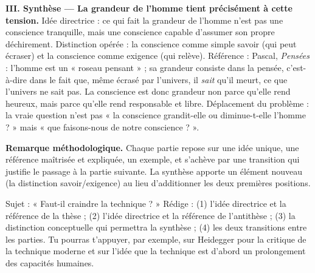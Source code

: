 \documentclass[11pt]{article}
\begin{document}
\begin{exoresolu}
\textbf{III. Synthèse — La grandeur de l'homme tient précisément à cette tension.}
Idée directrice : ce qui fait la grandeur de l'homme n'est pas une conscience tranquille, mais une conscience capable d'assumer son propre déchirement. Distinction opérée : la conscience comme simple savoir (qui peut écraser) et la conscience comme exigence (qui relève). Référence : Pascal, \emph{Pensées} : l'homme est un « roseau pensant » ; sa grandeur consiste dans la pensée, c'est-à-dire dans le fait que, même écrasé par l'univers, il \emph{sait} qu'il meurt, ce que l'univers ne sait pas. La conscience est donc grandeur non parce qu'elle rend heureux, mais parce qu'elle rend responsable et libre. Déplacement du problème : la vraie question n'est pas « la conscience grandit-elle ou diminue-t-elle l'homme ? » mais « que faisons-nous de notre conscience ? ».

\textbf{Remarque méthodologique.} Chaque partie repose sur une idée unique, une référence maîtrisée et expliquée, un exemple, et s'achève par une transition qui justifie le passage à la partie suivante. La synthèse apporte un élément nouveau (la distinction savoir/exigence) au lieu d'additionner les deux premières positions.
\end{exoresolu}

\begin{exercice}
Sujet : « Faut-il craindre la technique ? » Rédige : (1) l'idée directrice et la référence de la thèse ; (2) l'idée directrice et la référence de l'antithèse ; (3) la distinction conceptuelle qui permettra la synthèse ; (4) les deux transitions entre les parties. Tu pourras t'appuyer, par exemple, sur Heidegger pour la critique de la technique moderne et sur l'idée que la technique est d'abord un prolongement des capacités humaines.
\end{exercice}
\end{document}
